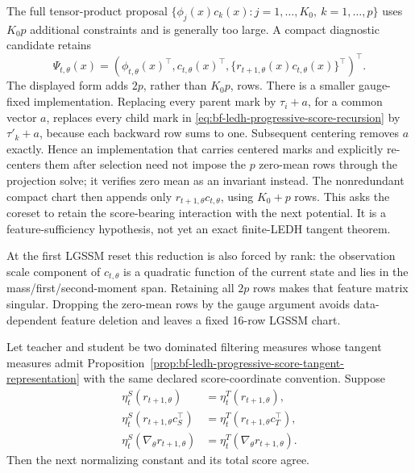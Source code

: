 The full tensor-product proposal
\(\{\phi_j(x)c_k(x):j=1,\ldots,K_0,\ k=1,\ldots,p\}\) uses \(K_0p\)
additional constraints and is generally too large.  A compact diagnostic
candidate retains
\begin{equation}
\label{eq:bf-ledh-compact-progressive-feature-vector}
  \Psi_{t,\theta}(x)
  =\left(
    \phi_{t,\theta}(x)^{\top},
    c_{t,\theta}(x)^{\top},
    \{r_{t+1,\theta}(x)c_{t,\theta}(x)\}^{\top}
   \right)^{\top}.
\end{equation}
The displayed form adds \(2p\), rather than \(K_0p\), rows.  There is a smaller
gauge-fixed implementation.  Replacing every parent mark by
\(\tau_i+a\), for a common vector \(a\), replaces every child mark in
\eqref{eq:bf-ledh-progressive-score-recursion} by \(\tau'_k+a\), because each
backward row sums to one.  Subsequent centering removes \(a\) exactly.  Hence an
implementation that carries centered marks and explicitly re-centers them after
selection need not impose the \(p\) zero-mean rows through the projection solve;
it verifies zero mean as an invariant instead.  The nonredundant compact chart
then appends only \(r_{t+1,\theta}c_{t,\theta}\), using \(K_0+p\) rows.  This asks
the coreset to retain the score-bearing interaction with the next potential.  It
is a feature-sufficiency hypothesis, not yet an exact finite-LEDH tangent
theorem.

At the first LGSSM reset this reduction is also forced by rank: the observation
scale component of \(c_{t,\theta}\) is a quadratic function of the current state
and lies in the mass/first/second-moment span.  Retaining all \(2p\) rows makes
that feature matrix singular.  Dropping the zero-mean rows by the gauge argument
avoids data-dependent feature deletion and leaves a fixed 16-row LGSSM chart.

\begin{proposition}
\label{prop:bf-ledh-progressive-next-score-preservation}
Let teacher and student be two dominated filtering measures whose tangent
measures admit Proposition~\ref{prop:bf-ledh-progressive-score-tangent-representation}
with the same declared score-coordinate convention.  Suppose
\begin{align}
  \eta_t^S(r_{t+1,\theta})&=\eta_t^T(r_{t+1,\theta}),
    \label{eq:bf-ledh-progressive-r-match}\\
  \eta_t^S(r_{t+1,\theta}c_S^{\top})
    &=\eta_t^T(r_{t+1,\theta}c_T^{\top}),
    \label{eq:bf-ledh-progressive-rc-match}\\
  \eta_t^S(\nabla_\theta r_{t+1,\theta})
    &=\eta_t^T(\nabla_\theta r_{t+1,\theta}).
    \label{eq:bf-ledh-progressive-dr-match}
\end{align}
Then the next normalizing constant and its total score agree.
\end{proposition}

